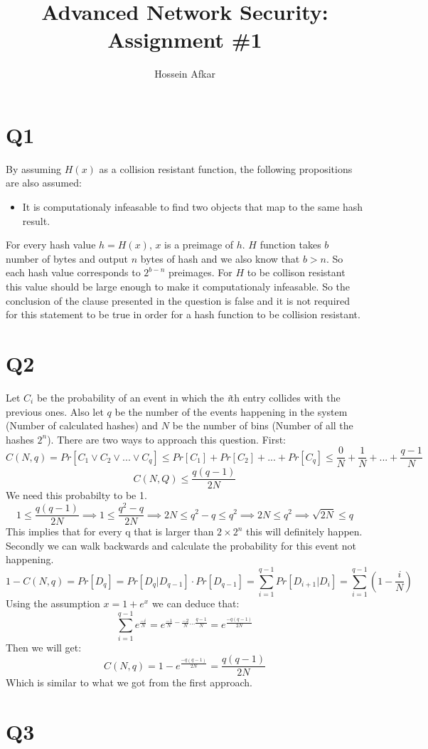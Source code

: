 \documentclass[a4paper, 11pt]{article}
\title{Advanced Network Security: Assignment \#1}
\author{Hossein Afkar}
\begin{document}
\maketitle
\section{Q1}
By assuming $H(x)$ as a collision resistant function, the following
propositions are also assumed:
\begin{itemize}
    \item It is computationaly infeasable to find two objects that map to the
        same hash result.
\end{itemize}
For every hash value $h = H(x)$, $x$ is a preimage of $h$.
$H$ function takes $b$ number of bytes and output $n$ bytes of hash and we
also know that $b > n$. So each hash value corresponds to $2^{b-n}$ preimages.
For $H$ to be collison resistant this value should be large enough to make it
computationaly infeasable. So the conclusion of the clause presented in the
question is false and it is not required for this statement to be true in
order for a hash function to be collision resistant.
\section{Q2}
Let $C_i$ be the probability of an event in which the \textit{i}th entry
collides with the previous ones. Also let $q$ be the number of the events
happening in the system (Number of calculated hashes) and $N$ be the number of
bins (Number of all the hashes $2^n$). There are two ways to approach this
question. First:
\begin{equation}
    C(N,q) = Pr[C_1 \vee C_2 \vee ... \vee C_q] \le Pr[C_1] + Pr[C_2] + ... + 
    Pr[C_q] \le \frac{0}{N} + \frac{1}{N} + ... + \frac{q-1}{N}
\end{equation}
\begin{equation}
    C(N,Q) \le \frac{q(q-1)}{2N}
\end{equation}
We need this probabilty to be 1.
\begin{equation}
    1 \le \frac{q(q-1)}{2N} \implies 1 \le \frac{q^2 - q}{2N} \implies 2N \le
    q^2 - q \le q^2 \implies 2N \le q^2 \implies \sqrt{2N} \le q
\end{equation}
This implies that for every q that is larger than $2 \times 2^n$ this will
definitely happen.
Secondly we can walk backwards and calculate the probability for this event
not happening.
\begin{equation}
    1 - C(N,q) = Pr[D_q] = Pr[D_q|D_{q-1}] \cdot Pr[D_{q-1}] = \sum_{i=1}^{q-1}Pr[D_{i+1}|D_i] = \sum_{i=1}^{q-1}(1-\frac{i}{N})
\end{equation}
Using the assumption $x = 1 + e^x$ we can deduce that:
\begin{equation}
    \sum_{i=1}^{q-1}e^{\frac{-i}{N}} = e^{\frac{-1}{N} - \frac{-2}{N} ...
    \frac{q-1}{N}} = e^{\frac{-q(q-1)}{2N}}
\end{equation}
Then we will get:
\begin{equation}
    C(N,q) = 1 - e^{\frac{-q(q-1)}{2N}} = \frac{q(q-1)}{2N}
\end{equation}
Which is similar to what we got from the first approach.
\section{Q3}
\end{document}
